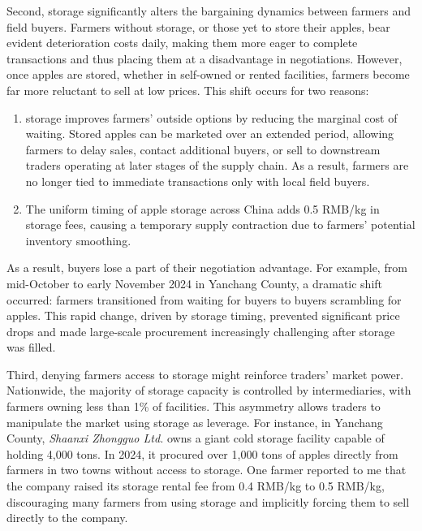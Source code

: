 Second, storage significantly alters the bargaining dynamics between farmers and field buyers. Farmers without storage, or those yet to store their apples, bear evident deterioration costs daily, making them more eager to complete transactions and thus placing them at a disadvantage in negotiations. However, once apples are stored, whether in self-owned or rented facilities, farmers become far more reluctant to sell at low prices. This shift occurs for two reasons: 
\begin{enumerate}
    \item storage improves farmers' outside options by reducing the marginal cost of waiting. Stored apples can be marketed over an extended period, allowing farmers to delay sales, contact additional buyers, or sell to downstream traders operating at later stages of the supply chain. As a result, farmers are no longer tied to immediate transactions only with local field buyers.
    \item The uniform timing of apple storage across China adds 0.5 RMB/kg in storage fees, causing a temporary supply contraction due to farmers' potential inventory smoothing.
\end{enumerate}
As a result, buyers lose a part of their negotiation advantage. For example, from mid-October to early November 2024 in Yanchang County, a dramatic shift occurred: farmers transitioned from waiting for buyers to buyers scrambling for apples. This rapid change, driven by storage timing, prevented significant price drops and made large-scale procurement increasingly challenging after storage was filled.


Third, denying farmers access to storage might reinforce traders' market power. Nationwide, the majority of storage capacity is controlled by intermediaries, with farmers owning less than 1\% of facilities. This asymmetry allows traders to manipulate the market using storage as leverage. For instance, in Yanchang County, \textit{Shaanxi Zhongguo Ltd.} owns a giant cold storage facility capable of holding 4,000 tons. In 2024, it procured over 1,000 tons of apples directly from farmers in two towns without access to storage. One farmer reported to me that the company raised its storage rental fee from 0.4 RMB/kg to 0.5 RMB/kg, discouraging many farmers from using storage and implicitly forcing them to sell directly to the company.

